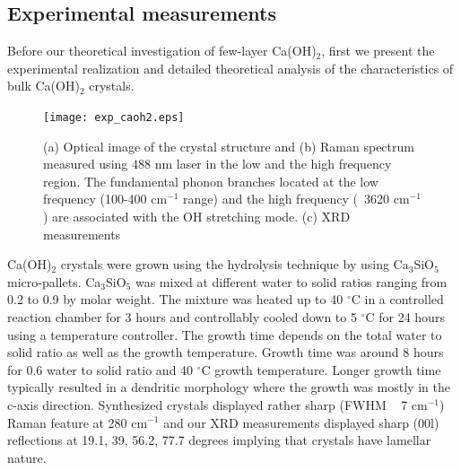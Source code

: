 \subsection{Experimental measurements}


Before our theoretical investigation of few-layer Ca(OH)$_{2}$, first we 
present the experimental realization and detailed theoretical analysis of the
characteristics of bulk Ca(OH)$_{2}$ crystals.


\begin{figure}[htbp]
\centering
\texttt{[image: exp\_caoh2.eps]}
\caption{\label{fig:exp_caoh2} (a) Optical image of the crystal structure and (b) Raman 
spectrum measured using 488 nm laser in the low and the high frequency region. 
The fundamental phonon branches located at the low frequency (100-400 cm$^{-1}$  range) and the high frequency (~3620 cm$^{-1}$) are associated with the OH  stretching mode. (c) XRD measurements}
\end{figure}

Ca(OH)$_{2}$ crystals were grown using the hydrolysis technique by using 
Ca$_{3}$SiO$_{5}$ micro-pallets. Ca$_{3}$SiO$_{5}$ was mixed at different water 
to solid ratios ranging from 0.2 to 0.9 by molar weight. The mixture was heated 
up to 40 $^{\circ}\mathrm{C}$ in a controlled reaction chamber for 3 hours and 
controllably cooled down to 5 $^{\circ}\mathrm{C}$ for 24 hours using a
temperature controller. The growth time depends on the total water to solid 
ratio as well as the growth temperature. Growth time was around 8 hours for 0.6 
water to solid ratio and 40 $^{\circ}\mathrm{C}$ growth temperature. 
Longer growth time typically resulted in a dendritic morphology where the 
growth was mostly in the c-axis direction. Synthesized crystals displayed rather sharp (FWHM ~ 7 cm$^{-1}$) Raman feature at 280 cm$^{-1}$ and our XRD measurements displayed sharp (00l) reflections at 19.1, 39, 56.2, 77.7 degrees implying that crystals have lamellar nature.  
 

